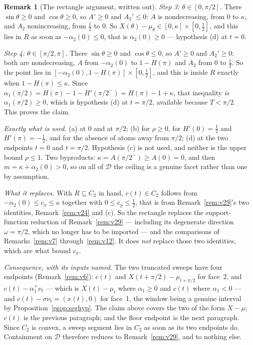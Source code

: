 \documentclass[11pt]{article}
\theoremstyle{definition}
\newtheorem{remark}[theorem]{Remark}
\begin{document}
\begin{remark}[The rectangle argument, written out]
\emph{Step 3: $\theta\in[0,\pi/2]$.} There $\sin\theta\ge0$ and $\cos\theta\ge0$, so $A'\ge0$
and $A_2'\le0$: $A$ is nondecreasing, from $0$ to $\kappa$, and $A_2$ nonincreasing, from
$\tfrac12$ to $0$.
So $X(\theta)-\mu_\theta\in[0,\kappa]\times[0,\tfrac12]$, and this lies in $R$ as soon as
$-\alpha_2(0)\le0$, that is $\alpha_2(0)\ge0$ --- hypothesis (d) at $t=0$.

\emph{Step 4: $\theta\in[\pi/2,\pi]$.} There $\sin\theta\ge0$ and $\cos\theta\le0$, so
$A'\ge0$ and $A_2'\ge0$: both are nondecreasing, $A$ from $-\alpha_2(0)$ to $1-H(\pi)$ and
$A_2$ from $0$ to $\tfrac12$. So the point lies in
$[-\alpha_2(0),1-H(\pi)]\times[0,\tfrac12]$, and
this is inside $R$ exactly when $1-H(\pi)\le\kappa$. Since
$\alpha_1(\pi/2)=H(\pi)-1-H'(\pi/2^-)=H(\pi)-1+\kappa$, that inequality \emph{is}
$\alpha_1(\pi/2)\ge0$, which is hypothesis (d) at $t=\pi/2$, available because $T<\pi/2$.
This proves the claim.

\emph{Exactly what is used.} (a) at $0$ and at $\pi/2$; (b) for $\rho\ge0$, for
$H'(0)=\tfrac12$ and $H'(\pi)=-\tfrac12$, and for the absence of atoms away from $\pi/2$;
(d) at the two endpoints $t=0$ and $t=\pi/2$. Hypothesis (c) is not used, and neither is the
upper bound $\rho\le1$. Two byproducts: $\kappa=A(\pi/2^-)\ge A(0)=0$, and then
$m=\kappa+\alpha_2(0)>0$, so on all of $\mathcal D$ the ceiling is a genuine facet rather
than one by assumption.

\emph{What it replaces.} With $R\subseteq C_2$ in hand, $c(t)\in C_2$ follows from
$-\alpha_2(0)\le c_x\le\kappa$ together with $0\le c_y\le\tfrac12$, that is from
Remark~\ref{rem:v29}'s two identities, Remark~\ref{rem:v24} and (c). So the rectangle
replaces the support-function reduction of Remark~\ref{rem:v29} --- including its degenerate
direction $\omega=\pi/2$, which no longer has to be imported --- and the comparisons of
Remarks~\ref{rem:v7} through~\ref{rem:v12}. It does \emph{not} replace those two identities,
which are what bound $c_x$.

\emph{Consequence, with its inputs named.} The two truncated sweeps have four endpoints
(Remark~\ref{rem:v6}): $c(t)$ and $X(t+\pi/2)-\mu_{t+\pi/2}$ for face~2, and
$c(t)-\alpha_1^+\nu_t$ --- which is $X(t)-\mu_t$ where $\alpha_1\ge0$ and $c(t)$ where
$\alpha_1<0$ --- and $c(t)-\sigma\nu_t=(x(t),0)$ for face~1, the window being a genuine
interval by Proposition~\ref{prop:seghyp}. The claim above covers the two of the form
$X-\mu$; $c(t)$ is the previous paragraph; and the floor endpoint is the next paragraph.
Since $C_2$ is convex, a sweep segment lies in
$C_2$ as soon as its two endpoints do. Containment on $\mathcal D$ therefore reduces to
Remark~\ref{rem:v29}, and to nothing else.


\end{remark}
\end{document}
